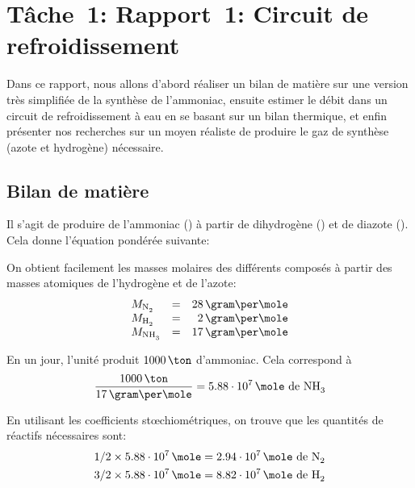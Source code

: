 \chapter{Tâche~1: Rapport~1: Circuit de refroidissement}

Dans ce rapport, nous allons d'abord réaliser un bilan de matière sur
une version très simplifiée de la synthèse de l'ammoniac,
ensuite estimer le débit dans un circuit de refroidissement à eau
en se basant sur un bilan thermique,
et enfin présenter nos recherches sur un moyen réaliste
de produire le gaz de synthèse
(azote et hydrogène) nécessaire.

\section{Bilan de matière}
\label{sec:matiere}

Il s'agit de produire de l'ammoniac () à partir de dihydrogène ()
et de diazote ().
Cela donne l'équation pondérée suivante:
\begin{center}
\end{center}

On obtient facilement les masses molaires des différents composés à partir
des masses atomiques de l'hydrogène et de l'azote:
\begin{equation*}
    \begin{array}{lcr}
        M_{\ce{N2}} &=& 28\,\gram\per\mole\\
        M_{\ce{H2}} &=& 2\,\gram\per\mole\\
        M_{\ce{NH3}} &=& 17\,\gram\per\mole\\
    \end{array}
\end{equation*}

En un jour, l'unité produit $1000\,\ton$ d'ammoniac.
Cela correspond à
\begin{equation}
    \label{eq:mole-nh3}
    \frac{1000\,\ton}{17\,\gram\per\mole} =
    5.88\cdot10^7\,\mole\mbox{ de \ce{NH3}}
\end{equation}

En utilisant les coefficients stœchiométriques, on trouve que les quantités de
réactifs nécessaires sont:
\begin{align*}
    1/2 \times 5.88\cdot10^7\,\mole &=
    2.94\cdot10^7\,\mole \mbox{ de \ce{N2}} \\
    3/2 \times 5.88\cdot10^7\,\mole &=
    8.82\cdot10^7\,\mole \mbox{ de \ce{H2}} \\
\end{align*}


